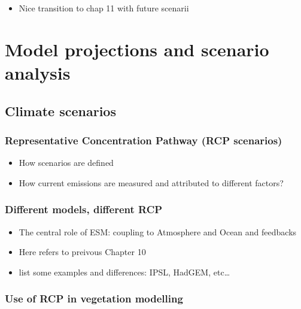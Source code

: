 \documentclass[
  12pt,
  oneside]{book}
\providecommand{\tightlist}{%
  \setlength{\itemsep}{0pt}\setlength{\parskip}{0pt}}
\begin{document}
\begin{itemize}
\tightlist
\item
  Nice transition to chap 11 with future scenarii
\end{itemize}

\hypertarget{model-projections-and-scenario-analysis}{%
\chapter{Model projections and scenario analysis}\label{model-projections-and-scenario-analysis}}


\hypertarget{climate-scenarios}{%
\section{Climate scenarios}\label{climate-scenarios}}

\hypertarget{representative-concentration-pathway-rcp-scenarios}{%
\subsection{Representative Concentration Pathway (RCP scenarios)}\label{representative-concentration-pathway-rcp-scenarios}}

\begin{itemize}
\tightlist
\item
  How scenarios are defined
\item
  How current emissions are measured and attributed to different factors?
\end{itemize}

\hypertarget{different-models-different-rcp}{%
\subsection{Different models, different RCP}\label{different-models-different-rcp}}

\begin{itemize}
\tightlist
\item
  The central role of ESM: coupling to Atmosphere and Ocean and feedbacks
\item
  Here refers to preivous Chapter 10
\item
  list some examples and differences: IPSL, HadGEM, etc\ldots{}
\end{itemize}

\hypertarget{use-of-rcp-in-vegetation-modelling}{%
\subsection{Use of RCP in vegetation modelling}\label{use-of-rcp-in-vegetation-modelling}}
\end{document}
